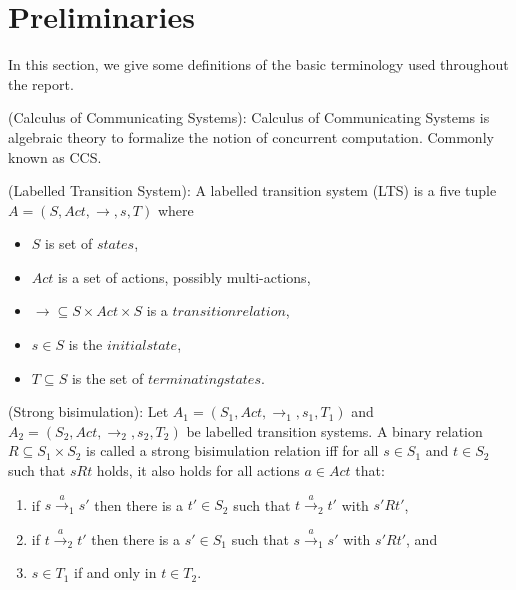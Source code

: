 \section{Preliminaries}

In this section, we give some definitions of the basic terminology used throughout the report.

\begin{definition}
(Calculus of Communicating Systems): Calculus of Communicating Systems is algebraic theory to formalize the notion of concurrent computation. Commonly known as CCS.
\end{definition}

\begin{definition}
(Labelled Transition System): A labelled transition system (LTS) is a five tuple $A=\left(S, Act, \rightarrow, s, T \right)$ where
\begin{itemize}
	\item $S$ is set of $states$,
	\item $Act$ is a set of actions, possibly multi-actions,
	\item $\rightarrow \subseteq S \times Act \times S$ is a $transition relation$,
	\item $s \in S$ is the $initial state$,
	\item $T \subseteq S$ is the set of $terminating states$.	
\end{itemize}
\end{definition}

\begin{definition}
(Strong bisimulation): Let $A_{1}=\left(S_{1}, Act, \rightarrow_{1}, s_{1}, T_{1}\right)$ and $A_{2}=\left(S_{2}, Act, \rightarrow_{2}, s_{2}, T_{2}\right)$ be labelled transition systems. A binary relation $R \subseteq S_{1} \times S_{2}$ is called a strong bisimulation relation iff for all $s \in S_{1}$ and $t \in S_{2}$ such that $sRt$ holds, it also holds for all actions $a \in Act$ that:
\begin{enumerate}
\item if $s\stackrel{a}{\rightarrow}_{1}s'$ then there is a $t' \in S_{2}$ such that $t\stackrel{a}{\rightarrow}_{2}t'$ with $s'Rt'$,
\item if $t\stackrel{a}{\rightarrow}_{2}t'$ then there is a $s' \in S_{1}$ such that $s\stackrel{a}{\rightarrow}_{1}s'$ with $s'Rt'$, and
\item $s \in T_{1}$ if and only in $t \in T_{2}$.
\end{enumerate}
\end{definition}

